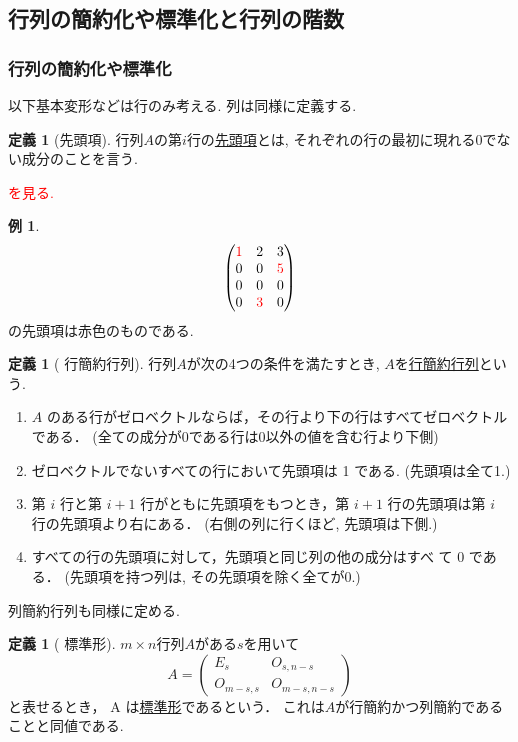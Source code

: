 \documentclass[dvipdfmx,a4paper,11pt]{article} %
\newcommand{\xr}[1]{\textcolor{red}{#1}}
\theoremstyle{definition}
\newtheorem{dfn}[thm]{定義}
\newtheorem{exa}[thm]{例}
\newenvironment{defn}{\begin{dfn}}{\end{dfn}}
\begin{document}
\subsection{行列の簡約化や標準化と行列の階数 \cite[2.3節]{O}}

\subsubsection{行列の簡約化や標準化}
以下基本変形などは行のみ考える. 列は同様に定義する. 

    \begin{dfn}[先頭項]
   \label{dfn-main}
  行列$A$の第$i$行の\underline{先頭項}とは, それぞれの行の最初に現れる0でない成分のことを言う. 
  \end{dfn}
\xr{\cite[例 2.3.1]{O}を見る.}
 
 \begin{exa}
 $$
  \begin{pmatrix}
\xr{1} & 2&3\\
0 & 0&\xr{5}\\
0 & 0&0\\
0 & \xr{3}&0\\ 
 \end{pmatrix}
 $$
 の先頭項は赤色のものである. 
 \end{exa}


\begin{dfn}[{\cite[定義 2.3.2 ]{O} 行簡約行列}]
  行列$A$が次の4つの条件を満たすとき, $A$を\underline{行簡約行列}という.
  \begin{enumerate}
  	\setlength{\parskip}{0cm}
  	\setlength{\itemsep}{0pt} 
\item \( A \) のある行がゼロベクトルならば，その行より下の行はすべてゼロベクトルである． (全ての成分が0である行は0以外の値を含む行より下側)
\item ゼロベクトルでないすべての行において先頭項は 1 である. (先頭項は全て1.)
\item 第 \( i \) 行と第 \( i+1 \) 行がともに先頭項をもつとき，第 \( i+1 \) 行の先頭項は第 \( i \) 行の先頭項より右にある． (右側の列に行くほど, 先頭項は下側.)
\item すべての行の先頭項に対して，先頭項と同じ列の他の成分はすべ
て 0 である． (先頭項を持つ列は, その先頭項を除く全てが0.)
  \end{enumerate}
  \end{dfn}
列簡約行列も同様に定める. 

\begin{defn}[{\cite[定義 2.3.2 ]{O} 標準形}]
$m \times n$行列$A$がある$s$を用いて
$$
A=
\begin{pmatrix}
E_s & O_{s,n-s}\\
O_{m-s,s} & O_{m-s,n-s}
\end{pmatrix}
$$
と表せるとき， A は\underline{標準形}であるという．
これは$A$が行簡約かつ列簡約であることと同値である. 
\end{defn}
\end{document}
